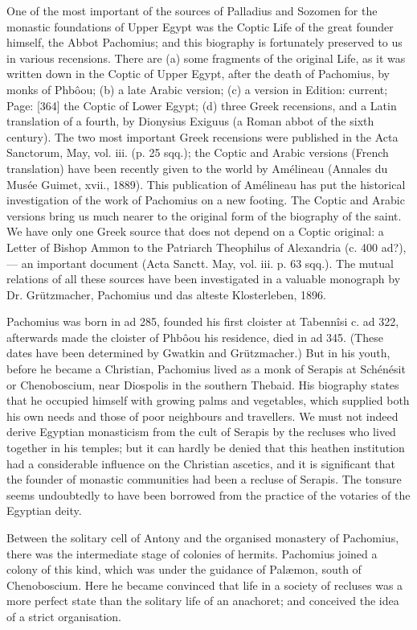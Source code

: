 One of the most important of the sources of Palladius and Sozomen for the monastic foundations of Upper Egypt was the Coptic Life of the great founder himself, the Abbot Pachomius; and this biography is fortunately preserved to us in various recensions. There are (a) some fragments of the original Life, as it was written down in the Coptic of Upper Egypt, after the death of Pachomius, by monks of Phbôou; (b) a late Arabic version; (c) a version in Edition: current; Page: [364] the Coptic of Lower Egypt; (d) three Greek recensions, and a Latin translation of a fourth, by Dionysius Exiguus (a Roman abbot of the sixth century). The two most important Greek recensions were published in the Acta Sanctorum, May, vol. iii. (p. 25 sqq.); the Coptic and Arabic versions (French translation) have been recently given to the world by Amélineau (Annales du Musée Guimet, xvii., 1889). This publication of Amélineau has put the historical investigation of the work of Pachomius on a new footing. The Coptic and Arabic versions bring us much nearer to the original form of the biography of the saint. We have only one Greek source that does not depend on a Coptic original: a Letter of Bishop Ammon to the Patriarch Theophilus of Alexandria (c. 400 ad?), \texthebrew{—} an important document (Acta Sanctt. May, vol. iii. p. 63 sqq.). The mutual relations of all these sources have been investigated in a valuable monograph by Dr. Grützmacher, Pachomius und das alteste Klosterleben, 1896.

Pachomius was born in ad 285, founded his first cloister at Tabennîsi c. ad 322, afterwards made the cloister of Phbôou his residence, died in ad 345. (These dates have been determined by Gwatkin and Grützmacher.) But in his youth, before he became a Christian, Pachomius lived as a monk of Serapis at Schénésit or Chenoboscium, near Diospolis in the southern Thebaid. His biography states that he occupied himself with growing palms and vegetables, which supplied both his own needs and those of poor neighbours and travellers. We must not indeed derive Egyptian monasticism from the cult of Serapis by the recluses who lived together in his temples; but it can hardly be denied that this heathen institution had a considerable influence on the Christian ascetics, and it is significant that the founder of monastic communities had been a recluse of Serapis. The tonsure seems undoubtedly to have been borrowed from the practice of the votaries of the Egyptian deity.

Between the solitary cell of Antony and the organised monastery of Pachomius, there was the intermediate stage of colonies of hermits. Pachomius joined a colony of this kind, which was under the guidance of Palæmon, south of Chenoboscium. Here he became convinced that life in a society of recluses was a more perfect state than the solitary life of an anachoret; and conceived the idea of a strict organisation.

